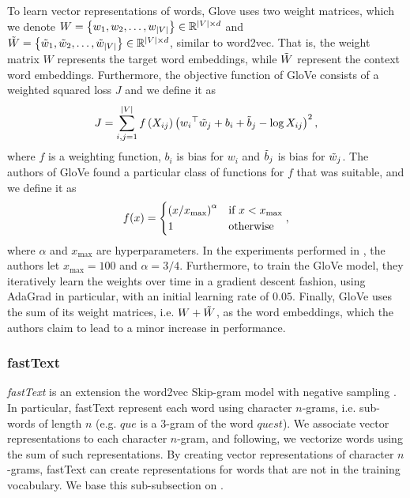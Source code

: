 To learn vector representations of words, Glove uses two weight matrices, which we denote $W=\left\{w_1, w_2, \ldots, w_{|V|}\right\} \in \mathbb{R}^{|V| \times d}$ and $\Tilde{W}=\left\{\Tilde{w}_1, \Tilde{w}_2, \ldots, \Tilde{w}_{|V|}\right\} \in \mathbb{R}^{|V| \times d}$, similar to word2vec. That is, the weight matrix $W$ represents the target word embeddings, while $\Tilde{W}$ represent the context word embeddings. Furthermore, the objective function of GloVe consists of a weighted squared loss $J$ and we define it as
\begin{align}
    J = \sum\limits_{i, j = 1}^{|V|} f \left(X_{ij}\right) \left({w_i}^\top \Tilde{w}_j + b_i + \Tilde{b}_j - \log X_{ij}\right)^2,
    \label{eqn:glove-loss}
\end{align}
where $f$ is a weighting function, $b_i$ is bias for $w_i$ and $\Tilde{b}_j$ is bias for $\Tilde{w}_j$. The authors of GloVe found a particular class of functions for $f$ that was suitable, and we define it as
\begin{align}
    f(x) = \begin{cases}
        \left(x / x_{\text{max}}\right)^\alpha & \mbox{if } x < x_{\text{max}} \\
        1 & \text{otherwise}
    \end{cases},
    \label{eqn:glove-loss-f-function}
\end{align}
where $\alpha$ and $x_{\text{max}}$ are hyperparameters. In the experiments performed in \cite{pennington2014glove}, the authors let $x_{\text{max}}=100$ and $\alpha=3/4$. Furthermore, to train the GloVe model, they iteratively learn the weights over time in a gradient descent fashion, using AdaGrad \cite{Duchi2011} in particular, with an initial learning rate of $0.05$. Finally, GloVe uses the sum of its weight matrices, i.e. $W + \Tilde{W}$, as the word embeddings, which the authors claim to lead to a minor increase in performance.

\subsubsection{fastText}
\label{sec:fasttext}
\textit{fastText} is an extension the word2vec Skip-gram model with negative sampling \cite{bojanowski2017enriching}. In particular, fastText represent each word using character $n$-grams, i.e. sub-words of length $n$ (e.g. $\textit{que}$ is a $3$-gram of the word $\textit{quest}$). We associate vector representations to each character $n$-gram, and following, we vectorize words using the sum of such representations. By creating vector representations of character $n$-grams, fastText can create representations for words that are not in the training vocabulary. We base this sub-subsection on \cite{bojanowski2017enriching}.

